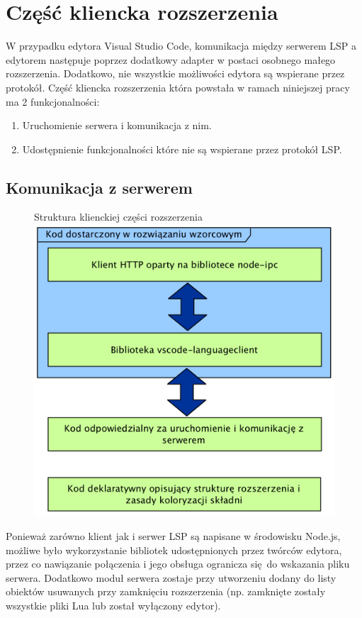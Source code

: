 \chapter{Część kliencka rozszerzenia}
W przypadku edytora Visual Studio Code, komunikacja między serwerem LSP a edytorem następuje poprzez dodatkowy adapter w postaci osobnego małego rozszerzenia. Dodatkowo, nie wszystkie możliwości edytora są wspierane przez protokół. Część kliencka rozszerzenia która powstała w ramach niniejszej pracy ma 2 funkcjonalności:

\begin{enumerate}
    \item Uruchomienie serwera i komunikacja z nim.
    \item Udostępnienie funkcjonalności które nie są wspierane przez protokół LSP.
\end{enumerate}

\section{Komunikacja z serwerem}
\begin{figure}[H]
\centering
Struktura klienckiej części rozszerzenia
\includegraphics[scale=0.5]{Chapters/struktura_klienta}
\end{figure}
Ponieważ zarówno klient jak i serwer LSP są napisane w środowisku Node.js, możliwe było wykorzystanie bibliotek udostępnionych przez twórców edytora, przez co nawiązanie połączenia i jego obsługa ogranicza się do wskazania pliku serwera. Dodatkowo moduł serwera zostaje przy utworzeniu dodany do listy obiektów usuwanych przy zamknięciu rozszerzenia (np. zamknięte zostały wszystkie pliki Lua lub został wyłączony edytor).


